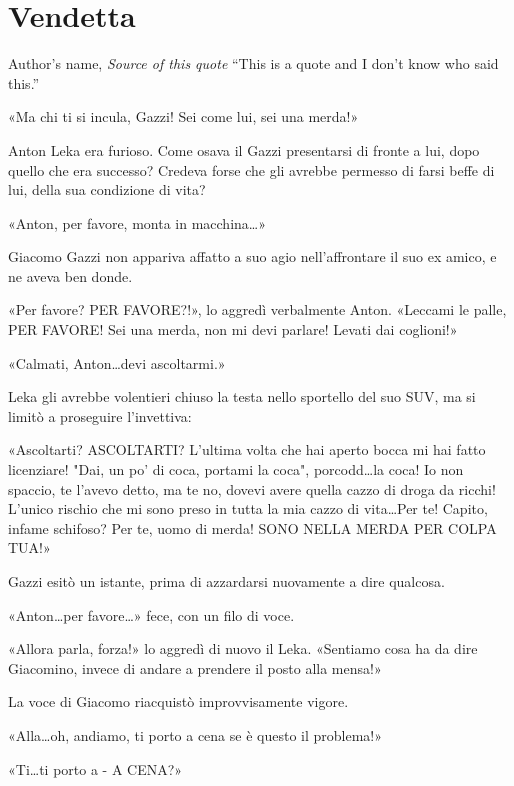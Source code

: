 \chapter{Vendetta}

\begin{chapquote}{Author's name, \textit{Source of this quote}}
``This is a quote and I don't know who said this.''
\end{chapquote}


«Ma chi ti si incula, Gazzi! Sei come lui, sei una merda!»

Anton Leka era furioso. Come osava il Gazzi presentarsi di fronte a lui, dopo quello che era successo? Credeva forse che gli avrebbe permesso di farsi beffe di lui, della sua condizione di vita?

«Anton, per favore, monta in macchina\ldots»

Giacomo Gazzi non appariva affatto a suo agio nell'affrontare il suo ex amico, e ne aveva ben donde.

«Per favore? PER FAVORE?!», lo aggredì verbalmente Anton. «Leccami le palle, PER FAVORE! Sei una merda, non mi devi parlare! Levati dai coglioni!»

«Calmati, Anton\ldots devi ascoltarmi.»

Leka gli avrebbe volentieri chiuso la testa nello sportello del suo SUV, ma si limitò a proseguire l'invettiva: 

«Ascoltarti? ASCOLTARTI? L'ultima volta che hai aperto bocca mi hai fatto licenziare! "Dai, un po' di coca, portami la coca", porcodd\ldots la coca! Io non spaccio, te l'avevo detto, ma te no, dovevi avere quella cazzo di droga da ricchi! L'unico rischio che mi sono preso in tutta la mia cazzo di vita\ldots Per te! Capito, infame schifoso? Per te, uomo di merda! SONO NELLA MERDA PER COLPA TUA!»

Gazzi esitò un istante, prima di azzardarsi nuovamente a dire qualcosa.

«Anton\ldots per favore\ldots» fece, con un filo di voce.

«Allora parla, forza!» lo aggredì di nuovo il Leka. «Sentiamo cosa ha da dire Giacomino, invece di andare a prendere il posto alla mensa!»

La voce di Giacomo riacquistò improvvisamente vigore.

«Alla\ldots oh, andiamo, ti porto a cena se è questo il problema!»

«Ti\ldots ti porto a - A CENA?»


